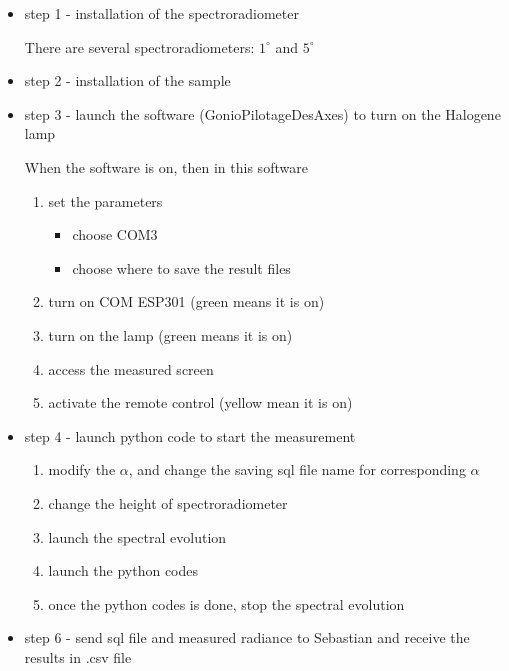 \begin{itemize}
    \item step 1 - installation of the spectroradiometer

          There are several spectroradiometers: $1^{\circ}$ and $5^{\circ}$

    \item step 2 - installation of the sample

    \item step 3 - launch the software (GonioPilotageDesAxes) to turn on the Halogene lamp

          When the software is on, then in this software
          \begin{enumerate}
              \item set the parameters
                    \begin{itemize}
                        \item choose COM3
                        \item choose where to save the result files
                    \end{itemize}

              \item turn on COM ESP301 (green means it is on)
              \item turn on the lamp (green means it is on)
              \item access the measured screen
              \item activate the remote control (yellow mean it is on)
          \end{enumerate}

    \item step 4 - launch python code to start the measurement
          \begin{enumerate}
              \item modify the $\alpha$, and change the saving sql file name for corresponding $\alpha$
              \item change the height of spectroradiometer
              \item launch the spectral evolution
              \item launch the python codes
              \item once the python codes is done, stop the spectral evolution
          \end{enumerate}

    \item step 6 - send sql file and measured radiance to Sebastian and receive the results in .csv file
\end{itemize}



